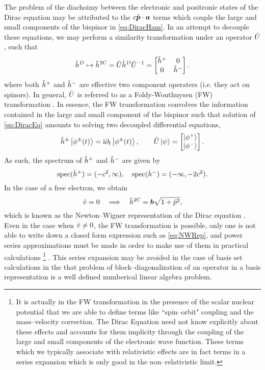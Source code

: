 The problem of the diachoimy between the electronic and positronic states of the Dirac
equation may be attributed to the $c \hat{\boldsymbol{p}} \cdot \boldsymbol{a}$ terms which couple the 
large and small components of the bispinor in \cref{eq:DiracHam}. In an attempt
to decouple these equations, we may perform a similarity transformation under an operator $\hat{U}$, such that
\begin{equation}
\label{eq:FW}
\hat{h}^D \mapsto \hat{h}^{\mathrm{2C}}  = \hat{U} \hat{h}^D \hat{U}^{-1} = \begin{bmatrix} \hat{h}^+ & 0 \\ 0 & \hat{h}^- \end{bmatrix}.
\end{equation}
where both $\hat{h}^+$ and $\hat{h}^-$ are effective two component operaters (i.e. they act on spinors).
In general, $\hat{U}$ is referred to as a Foldy-Wouthuysen (FW) transformation .
In essence, the FW transformation convolves the information contained in the large and small
component of the bispinor such that solution of \cref{eq:DiracEq} amounts to solving two decoupled 
differential equations,
\begin{align}
\hat{h}^\pm \left\vert  \phi^\pm (t)  \right\rangle = \mathrm i \partial_t \left\vert \phi^\pm (t) \right\rangle, \qquad \hat{U} \left\vert \psi \right\rangle = \begin{bmatrix} \left\vert \phi^+ \right\rangle \\ \left\vert \phi^- \right\rangle \end{bmatrix}.
\end{align}
As such, the spectrum of $\hat{h}^+$ and $\hat{h}^-$ are given by
\begin{equation}
\mathrm{spec}(\hat{h}^+) = (-c^2,\infty), \quad 
\mathrm{spec}(\hat{h}^-) = (-\infty,-2c^2).
\end{equation}
In the case of a free electron, we obtain 
\begin{equation}
\label{eq:NWRep}
\hat{v} = 0 \quad \Longrightarrow \quad \hat{h}^{\mathrm{2C}} = \boldsymbol{b} \sqrt{1 + \hat{p}^2},
\end{equation}
which is known as the Newton--Wigner representation of the Dirac equation . Even in the case
when $\hat{v} \neq 0$, the FW transformation is possible, only one is not able to write down a closed
form expression such as \cref{eq:NWRep}, and power series approximations must be made in order to make
use of them in practical calculations 
\footnote{It is actually in the FW transformation in the presence of the scalar nuclear  potential 
that we are able to define terms like ``spin--orbit" coupling and the mass--velocity correction. The Dirac Equation need not know explicitly 
about these effects and accounts for them implicity through the coupling of the large and small components
of the electronic wave function. These terms which we typically associate with relativistic effects are in fact
terms in a series expansion which is only good in the non--relativistic limit.}
. 
This series expansion may be avoided in the case of basis set calculations 
in the that problem of block--diagonalization of an operator in a basis representation is a well defined
numberical linear algebra problem.

